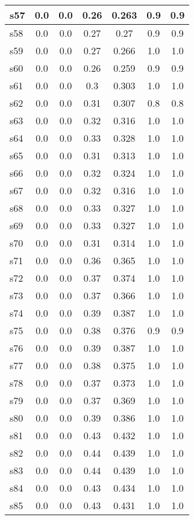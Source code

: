 \documentclass{article}
\begin{document}
\begin{tabular}{|l|c|c|c|c|c|c|}
\hline
s57 &0.0 & 0.0 & 0.26 & 0.263 & 0.9 & 0.9\\
\hline
s58 &0.0 & 0.0 & 0.27 & 0.27 & 0.9 & 0.9\\
\hline
s59 &0.0 & 0.0 & 0.27 & 0.266 & 1.0 & 1.0\\
\hline
s60 &0.0 & 0.0 & 0.26 & 0.259 & 0.9 & 0.9\\
\hline
s61 &0.0 & 0.0 & 0.3 & 0.303 & 1.0 & 1.0\\
\hline
s62 &0.0 & 0.0 & 0.31 & 0.307 & 0.8 & 0.8\\
\hline
s63 &0.0 & 0.0 & 0.32 & 0.316 & 1.0 & 1.0\\
\hline
s64 &0.0 & 0.0 & 0.33 & 0.328 & 1.0 & 1.0\\
\hline
s65 &0.0 & 0.0 & 0.31 & 0.313 & 1.0 & 1.0\\
\hline
s66 &0.0 & 0.0 & 0.32 & 0.324 & 1.0 & 1.0\\
\hline
s67 &0.0 & 0.0 & 0.32 & 0.316 & 1.0 & 1.0\\
\hline
s68 &0.0 & 0.0 & 0.33 & 0.327 & 1.0 & 1.0\\
\hline
s69 &0.0 & 0.0 & 0.33 & 0.327 & 1.0 & 1.0\\
\hline
s70 &0.0 & 0.0 & 0.31 & 0.314 & 1.0 & 1.0\\
\hline
s71 &0.0 & 0.0 & 0.36 & 0.365 & 1.0 & 1.0\\
\hline
s72 &0.0 & 0.0 & 0.37 & 0.374 & 1.0 & 1.0\\
\hline
s73 &0.0 & 0.0 & 0.37 & 0.366 & 1.0 & 1.0\\
\hline
s74 &0.0 & 0.0 & 0.39 & 0.387 & 1.0 & 1.0\\
\hline
s75 &0.0 & 0.0 & 0.38 & 0.376 & 0.9 & 0.9\\
\hline
s76 &0.0 & 0.0 & 0.39 & 0.387 & 1.0 & 1.0\\
\hline
s77 &0.0 & 0.0 & 0.38 & 0.375 & 1.0 & 1.0\\
\hline
s78 &0.0 & 0.0 & 0.37 & 0.373 & 1.0 & 1.0\\
\hline
s79 &0.0 & 0.0 & 0.37 & 0.369 & 1.0 & 1.0\\
\hline
s80 &0.0 & 0.0 & 0.39 & 0.386 & 1.0 & 1.0\\
\hline
s81 &0.0 & 0.0 & 0.43 & 0.432 & 1.0 & 1.0\\
\hline
s82 &0.0 & 0.0 & 0.44 & 0.439 & 1.0 & 1.0\\
\hline
s83 &0.0 & 0.0 & 0.44 & 0.439 & 1.0 & 1.0\\
\hline
s84 &0.0 & 0.0 & 0.43 & 0.434 & 1.0 & 1.0\\
\hline
s85 &0.0 & 0.0 & 0.43 & 0.431 & 1.0 & 1.0\\

\end{tabular}
\end{document}
